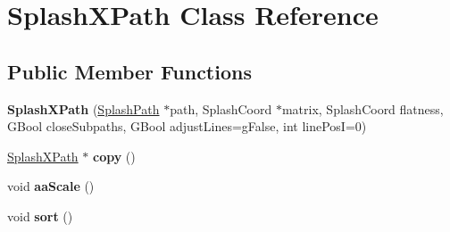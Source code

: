 \hypertarget{class_splash_x_path}{}\section{Splash\+X\+Path Class Reference}
\label{class_splash_x_path}
\subsection*{Public Member Functions}
\begin{DoxyCompactItemize}
\item 
\mbox{\label{class_splash_x_path_a8b783df51e07597d00b6a75fda9f79ff}} 
{\bfseries Splash\+X\+Path} (\hyperlink{class_splash_path}{Splash\+Path} $\ast$path, Splash\+Coord $\ast$matrix, Splash\+Coord flatness, G\+Bool close\+Subpaths, G\+Bool adjust\+Lines=g\+False, int line\+PosI=0)
\item 
\mbox{\label{class_splash_x_path_aea62ad99e4e1742a3861191d6e28470b}} 
\hyperlink{class_splash_x_path}{Splash\+X\+Path} $\ast$ {\bfseries copy} ()
\item 
\mbox{\label{class_splash_x_path_a3e31a75a4f768c7dca0dbff1fc768658}} 
void {\bfseries aa\+Scale} ()
\item 
\mbox{\label{class_splash_x_path_a5d8c905690ae8c7093e84859be16b143}} 
void {\bfseries sort} ()
\end{DoxyCompactItemize}
